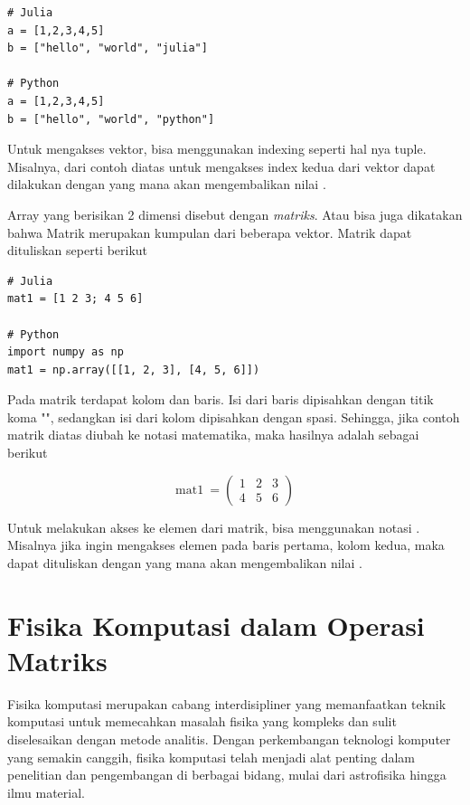 \begin{lstlisting}
# Julia
a = [1,2,3,4,5]
b = ["hello", "world", "julia"]

# Python
a = [1,2,3,4,5]
b = ["hello", "world", "python"]
\end{lstlisting}

\noindent
Untuk mengakses vektor, bisa menggunakan indexing seperti hal nya tuple.
Misalnya, dari contoh diatas untuk mengakses index kedua dari vektor 
dapat dilakukan dengan  yang mana akan mengembalikan nilai .

Array yang berisikan 2 dimensi disebut dengan \emph{matriks}. Atau bisa juga
dikatakan bahwa Matrik merupakan kumpulan dari beberapa vektor. Matrik dapat
dituliskan seperti berikut

\begin{lstlisting}
# Julia
mat1 = [1 2 3; 4 5 6]

# Python
import numpy as np
mat1 = np.array([[1, 2, 3], [4, 5, 6]])
\end{lstlisting}

\noindent
Pada matrik terdapat kolom dan baris. Isi dari baris dipisahkan dengan titik
koma "\cw{;}", sedangkan isi dari kolom dipisahkan dengan spasi. Sehingga, jika
contoh matrik diatas diubah ke notasi matematika, maka hasilnya adalah sebagai berikut

\begin{equation}
	\text{mat1}\ = \left(
	\begin{matrix}
			1 & 2 & 3 \\
			4 & 5 & 6
		\end{matrix}
	\right)
\end{equation}

\noindent
Untuk melakukan akses ke elemen dari matrik, bisa menggunakan notasi .
Misalnya jika ingin mengakses elemen pada baris pertama, kolom kedua, maka dapat
dituliskan dengan  yang mana akan mengembalikan nilai .

\section{Fisika Komputasi dalam Operasi Matriks}

Fisika komputasi merupakan cabang interdisipliner yang memanfaatkan teknik
komputasi untuk memecahkan masalah fisika yang kompleks dan sulit diselesaikan
dengan metode analitis. Dengan perkembangan teknologi komputer yang semakin
canggih, fisika komputasi telah menjadi alat penting dalam penelitian dan
pengembangan di berbagai bidang, mulai dari astrofisika hingga ilmu material.

